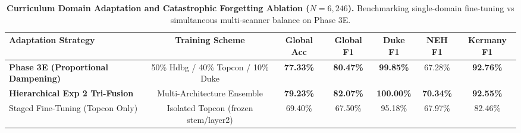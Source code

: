 \documentclass{article}
\begin{document}
\begin{table}[t]
\centering
\small
\caption{\textbf{Curriculum Domain Adaptation and Catastrophic Forgetting Ablation ($N = 6,246$).} Benchmarking single-domain fine-tuning vs simultaneous multi-scanner balance on Phase 3E.}
\label{tab:catastrophic_forgetting}
\begin{tabular}{lcccccc}
\toprule
\textbf{Adaptation Strategy} & \textbf{Training Scheme} & \textbf{Global Acc} & \textbf{Global F1} & \textbf{Duke F1} & \textbf{NEH F1} & \textbf{Kermany F1} \\
\midrule
\textbf{Phase 3E (Proportional Dampening)} & 50\% Hdbg / 40\% Topcon / 10\% Duke & \textbf{77.33\%} & \textbf{80.47\%} & \textbf{99.85\%} & 67.28\% & \textbf{92.76\%} \\
\textbf{Hierarchical Exp 2 Tri-Fusion} & Multi-Architecture Ensemble & \textbf{79.23\%} & \textbf{82.07\%} & \textbf{100.00\%} & \textbf{70.34\%} & \textbf{92.55\%} \\
Staged Fine-Tuning (Topcon Only) & Isolated Topcon (frozen stem/layer2) & 69.40\% & 67.50\% & 95.18\% & 67.97\% & 82.46\% \\
\bottomrule
\end{tabular}
\end{table}
\end{document}
